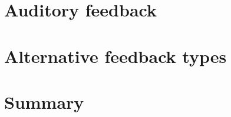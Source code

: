 	
\section{Auditory feedback}
\label{sec:fb:auditory}

\citep{Bonneau2011}

%	
	
	
	
\section{Alternative feedback types}
\label{sec:fb:alternative}

%	
%	

\section{Summary}
\label{sec:fb:summary}